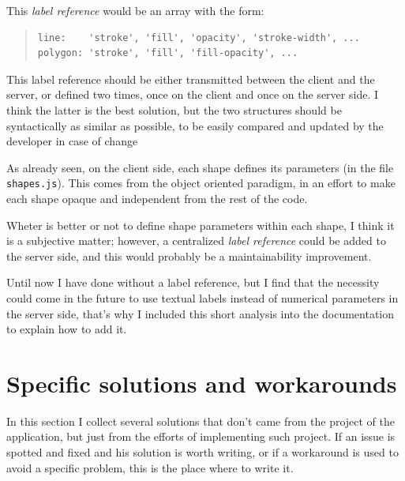 \documentclass[10pt,a4paper,english]{book}
\begin{document}
This \emph{label reference} would be an array with the form:
\begin{quote}\begin{verbatim}
line:    'stroke', 'fill', 'opacity', 'stroke-width', ...
polygon: 'stroke', 'fill', 'fill-opacity', ...
\end{verbatim}
\end{quote}

This label reference should be either transmitted between the client
and the server, or defined two times, once on the client and once on
the server side. I think the latter is the best solution, but the two
structures should be syntactically as similar as possible, to be
easily compared and updated by the developer in case of change

As already seen, on the client side, each shape defines its parameters
(in the file \texttt{shapes.js}). This comes from the object oriented
paradigm, in an effort to make each shape opaque and independent from
the rest of the code.

Wheter is better or not to define shape parameters within each shape,
I think it is a subjective matter; however, a centralized \emph{label
reference} could be added to the server side, and this would probably
be a maintainability improvement.

Until now I have done without a label reference, but I find that the
necessity could come in the future to use textual labels instead of
numerical parameters in the server side, that's why I included this
short analysis into the documentation to explain how to add it.



\hypertarget{specific-solutions-and-workarounds}{}
\chapter{Specific solutions and workarounds}
\label{specific-solutions-and-workarounds}

In this section I collect several solutions that don't came from the
project of the application, but just from the efforts of implementing
such project. If an issue is spotted and fixed and his solution is
worth writing, or if a workaround is used to avoid a specific problem,
this is the place where to write it.


\end{document}
